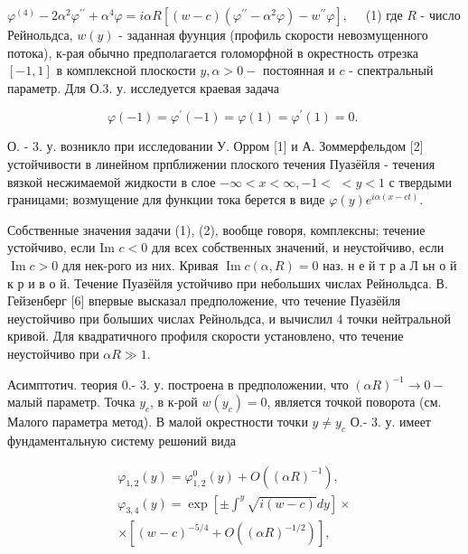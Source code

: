 \documentclass[10pt]{article}
\begin{document}
$\varphi^{(4)}-2 \alpha^{2} \varphi^{\prime \prime}+\alpha^{4} \varphi=i \alpha R\left[(w-c)\left(\varphi^{\prime \prime}-\alpha^{2} \varphi\right)-w^{\prime \prime} \varphi\right], \quad$ (1) где $R$ - число Рейнольдса, $w(y)$ - заданная фуунция (профиль скорости невозмущенного потока), к-рая обычно предполагается голоморфной в окрестность отрезка $[-1,1]$ в комплексной плоскости $y, \alpha>0-$ постоянная и $c$ - спектральный параметр. Для О.3. у. исследуется краевая задача



\[

\varphi(-1)=\varphi^{\prime}(-1)=\varphi(1)=\varphi^{\prime}(1)=0 \text {. }

\]



О. - 3. у. возникло при исследовании У. Орром [1] и А. Зоммерфельдом [2] устойчивости в линейном прпближении плоского течения Пуазёйля - течения вязкой несжимаемой жидкости в слое $-\infty<x<\infty,-1<$ $<y<1$ с твердыми границами; возмущение для функции тока берется в виде $\varphi(y) e^{i \alpha(x-c t)}$.



Собственные значения задачи (1), (2), вообще говоря, комплексны; течение устойчиво, если Im $c<0$ для всех собственных значений, и неустойчиво, если $\operatorname{Im} c>0$ для нек-рого из них. Кривая $\operatorname{Im} c(\alpha, R)=0$ наз. н е й т р а Л ьн о й к р и в о й. Течение Пуазёйля устойчиво при небольших числах Рейнольдса. В. Гейзенберг [6] впервые высказал предположение, что течение Пуазёйля неустойчиво при болыших числах Рейнольдса, и вычислил 4 точки нейтральной кривой. Для квадратичного профиля скорости установлено, что течение неустойчиво при $\alpha R \gg 1$.



Асимптотич. теория 0.- 3. у. построена в предположении, что $(\alpha R)^{-1} \rightarrow 0-$ малый параметр. Точка $y_{c}$, в к-рой $w\left(y_{c}\right)=0$, является точкой поворота (см. Малого параметра метод). В малой окрестности точки $y \neq y_{c}$ О.- 3. у. имеет фундаментальную систему решөний вида



\[

\begin{gathered}

\varphi_{1,2}(y)=\varphi_{1,2}^{0}(y)+O\left((\alpha R)^{-1}\right), \\

\varphi_{3,4}(y)=\exp \left[ \pm \int^{y} \sqrt{i(w-c)} d y\right] \times \\

\times\left[(w-c)^{-5 / 4}+O\left((\alpha R)^{-1 / 2}\right)\right],

\end{gathered}

\]
\end{document}
